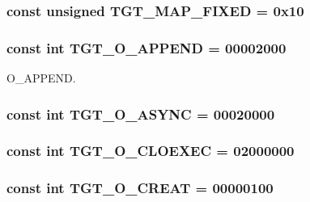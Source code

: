\label{classX86Linux64_a0bbc267200567dd98250b99b6085a499}
\hypertarget{classX86Linux64_a0124e421d7846143bca15728b7a53e14}{
\subsubsection[{TGT\_\-MAP\_\-FIXED}]{\setlength{\rightskip}{0pt plus 5cm}const unsigned {\bf TGT\_\-MAP\_\-FIXED} = 0x10}}
\label{classX86Linux64_a0124e421d7846143bca15728b7a53e14}
\hypertarget{classX86Linux64_af11adc5404ea3780a5ce2829cc3710b7}{
\subsubsection[{TGT\_\-O\_\-APPEND}]{\setlength{\rightskip}{0pt plus 5cm}const int {\bf TGT\_\-O\_\-APPEND} = 00002000}}
\label{classX86Linux64_af11adc5404ea3780a5ce2829cc3710b7}


O\_\-APPEND. \hypertarget{classX86Linux64_a83565a2a25516c6f6851ab78b9fc6ebe}{
\subsubsection[{TGT\_\-O\_\-ASYNC}]{\setlength{\rightskip}{0pt plus 5cm}const int {\bf TGT\_\-O\_\-ASYNC} = 00020000}}
\label{classX86Linux64_a83565a2a25516c6f6851ab78b9fc6ebe}
\hypertarget{classX86Linux64_a34aa7ec867a12296e12a851c47fb56d4}{
\subsubsection[{TGT\_\-O\_\-CLOEXEC}]{\setlength{\rightskip}{0pt plus 5cm}const int {\bf TGT\_\-O\_\-CLOEXEC} = 02000000}}
\label{classX86Linux64_a34aa7ec867a12296e12a851c47fb56d4}
\hypertarget{classX86Linux64_aec02e04ca367e6c3f4b46e4edc12efac}{
\subsubsection[{TGT\_\-O\_\-CREAT}]{\setlength{\rightskip}{0pt plus 5cm}const int {\bf TGT\_\-O\_\-CREAT} = 00000100}}
\label{classX86Linux64_aec02e04ca367e6c3f4b46e4edc12efac}


